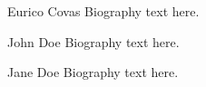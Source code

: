 \documentclass[journal]{IEEEtran}
\begin{document}


%

\begin{IEEEbiographynophoto}{Eurico Covas}
Biography text here.
\end{IEEEbiographynophoto}

\begin{IEEEbiographynophoto}{John Doe}
Biography text here.
\end{IEEEbiographynophoto}


\begin{IEEEbiographynophoto}{Jane Doe}
Biography text here.
\end{IEEEbiographynophoto}






\end{document}
